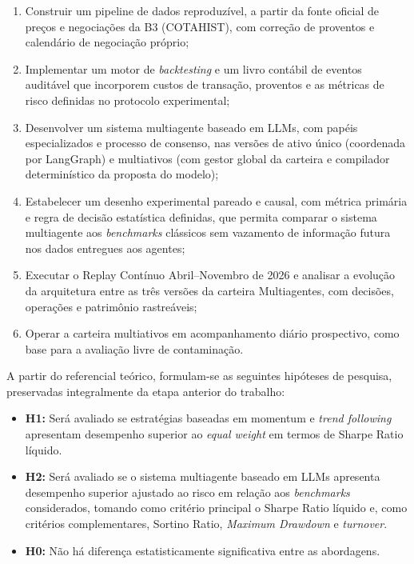 \documentclass{eic-bcc-tcc}
\begin{document}
\begin{enumerate}
    \item Construir um pipeline de dados reproduzível, a partir da fonte oficial de preços e negociações da B3 (COTAHIST), com correção de proventos e calendário de negociação próprio;
    \item Implementar um motor de \textit{backtesting} e um livro contábil de eventos auditável que incorporem custos de transação, proventos e as métricas de risco definidas no protocolo experimental;
    \item Desenvolver um sistema multiagente baseado em LLMs, com papéis especializados e processo de consenso, nas versões de ativo único (coordenada por LangGraph) e multiativos (com gestor global da carteira e compilador determinístico da proposta do modelo);
    \item Estabelecer um desenho experimental pareado e causal, com métrica primária e regra de decisão estatística definidas, que permita comparar o sistema multiagente aos \textit{benchmarks} clássicos sem vazamento de informação futura nos dados entregues aos agentes;
    \item Executar o Replay Contínuo Abril--Novembro de 2026 e analisar a evolução da arquitetura entre as três versões da carteira Multiagentes, com decisões, operações e patrimônio rastreáveis;
    \item Operar a carteira multiativos em acompanhamento diário prospectivo, como base para a avaliação livre de contaminação.
\end{enumerate}

A partir do referencial teórico, formulam-se as seguintes hipóteses de pesquisa, preservadas integralmente da etapa anterior do trabalho:

\begin{itemize}
    \item \textbf{H1:} Será avaliado se estratégias baseadas em momentum e \textit{trend following} apresentam desempenho superior ao \textit{equal weight} em termos de Sharpe Ratio líquido.
    \item \textbf{H2:} Será avaliado se o sistema multiagente baseado em LLMs apresenta desempenho superior ajustado ao risco em relação aos \textit{benchmarks} considerados, tomando como critério principal o Sharpe Ratio líquido e, como critérios complementares, Sortino Ratio, \textit{Maximum Drawdown} e \textit{turnover}.
    \item \textbf{H0:} Não há diferença estatisticamente significativa entre as abordagens.
\end{itemize}
\end{document}
